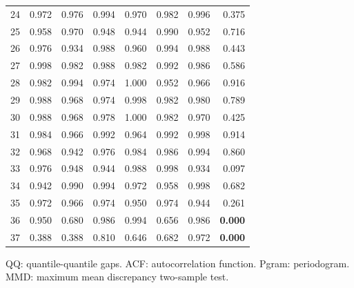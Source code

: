 \documentclass[11pt,a4paper]{article}
\begin{document}
\begin{center}
\begin{tabular}{lrrrrrrr}
24 & 0.972 & 0.976 & 0.994 & 0.970 & 0.982 & 0.996 & 0.375 \\
25 & 0.958 & 0.970 & 0.948 & 0.944 & 0.990 & 0.952 & 0.716 \\
26 & 0.976 & 0.934 & 0.988 & 0.960 & 0.994 & 0.988 & 0.443 \\
27 & 0.998 & 0.982 & 0.988 & 0.982 & 0.992 & 0.986 & 0.586 \\
28 & 0.982 & 0.994 & 0.974 & 1.000 & 0.952 & 0.966 & 0.916 \\
29 & 0.988 & 0.968 & 0.974 & 0.998 & 0.982 & 0.980 & 0.789 \\
30 & 0.988 & 0.968 & 0.978 & 1.000 & 0.982 & 0.970 & 0.425 \\
31 & 0.984 & 0.966 & 0.992 & 0.964 & 0.992 & 0.998 & 0.914 \\
32 & 0.968 & 0.942 & 0.976 & 0.984 & 0.986 & 0.994 & 0.860 \\
33 & 0.976 & 0.948 & 0.944 & 0.988 & 0.998 & 0.934 & 0.097 \\
34 & 0.942 & 0.990 & 0.994 & 0.972 & 0.958 & 0.998 & 0.682 \\
35 & 0.972 & 0.966 & 0.974 & 0.950 & 0.974 & 0.944 & 0.261 \\
36 & 0.950 & 0.680 & 0.986 & 0.994 & 0.656 & 0.986 & \textbf{0.000} \\
37 & 0.388 & 0.388 & 0.810 & 0.646 & 0.682 & 0.972 & \textbf{0.000} \\
\bottomrule
\end{tabular}
\end{center}

QQ: quantile-quantile gaps. ACF: autocorrelation function. Pgram: periodogram. MMD: maximum mean discrepancy two-sample test.
\end{document}
